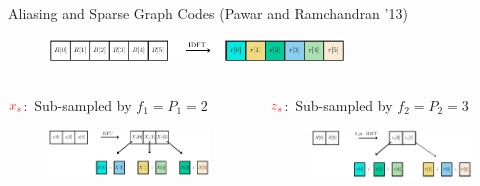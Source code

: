 \documentclass[10pt,xcolor=table]{beamer}
\begin{document}
	\begin{frame}{Aliasing and Sparse Graph Codes (Pawar and Ramchandran '13)}
	
		\begin{block}{}
			\begin{figure}[t]
				\centering
				\includegraphics[width=3.1in]{X_DFT}
			\end{figure}
		\end{block}
		
		\begin{columns}
			
			\column{.47\textwidth}
			\begin{block}{{\small $\color{red}x_s$:\ Sub-sampled by $f_1=P_1=2$}}
				\begin{figure}[t]
					\centering
					\includegraphics[width=2.3in]{Xs}
				\end{figure}
			\end{block}
			
			\begin{block}{{\small$\color{red}z_s$:\ Sub-sampled by $f_2=P_2=3$}}
				\begin{figure}[t]
					\centering
					\includegraphics[width=2.3in]{Zs}
				\end{figure}
			\end{block}
			

\end{columns}
\end{frame}
\end{document}
